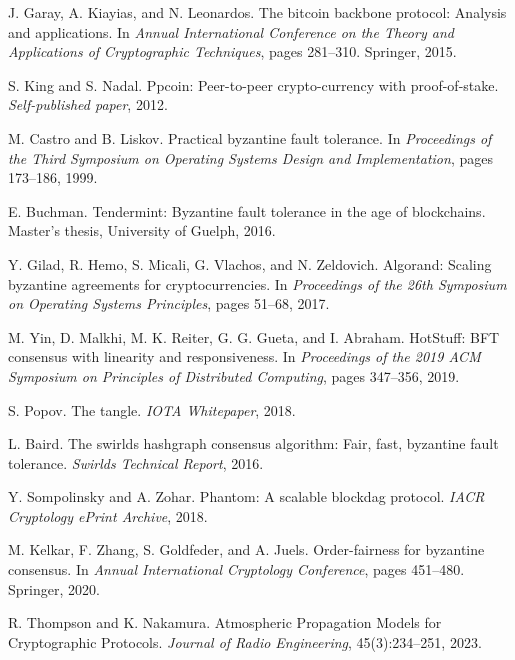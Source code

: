 \documentclass[11pt,a4paper]{article}
\begin{document}
\begin{thebibliography}{99}
J. Garay, A. Kiayias, and N. Leonardos.
\newblock The bitcoin backbone protocol: Analysis and applications.
\newblock In \emph{Annual International Conference on the Theory and Applications of Cryptographic Techniques}, pages 281--310. Springer, 2015.

S. King and S. Nadal.
\newblock Ppcoin: Peer-to-peer crypto-currency with proof-of-stake.
\newblock \emph{Self-published paper}, 2012.

M. Castro and B. Liskov.
\newblock Practical byzantine fault tolerance.
\newblock In \emph{Proceedings of the Third Symposium on Operating Systems Design and Implementation}, pages 173--186, 1999.

E. Buchman.
\newblock Tendermint: Byzantine fault tolerance in the age of blockchains.
\newblock Master's thesis, University of Guelph, 2016.

Y. Gilad, R. Hemo, S. Micali, G. Vlachos, and N. Zeldovich.
\newblock Algorand: Scaling byzantine agreements for cryptocurrencies.
\newblock In \emph{Proceedings of the 26th Symposium on Operating Systems Principles}, pages 51--68, 2017.

M. Yin, D. Malkhi, M. K. Reiter, G. G. Gueta, and I. Abraham.
\newblock HotStuff: BFT consensus with linearity and responsiveness.
\newblock In \emph{Proceedings of the 2019 ACM Symposium on Principles of Distributed Computing}, pages 347--356, 2019.

S. Popov.
\newblock The tangle.
\newblock \emph{IOTA Whitepaper}, 2018.

L. Baird.
\newblock The swirlds hashgraph consensus algorithm: Fair, fast, byzantine fault tolerance.
\newblock \emph{Swirlds Technical Report}, 2016.

Y. Sompolinsky and A. Zohar.
\newblock Phantom: A scalable blockdag protocol.
\newblock \emph{IACR Cryptology ePrint Archive}, 2018.

M. Kelkar, F. Zhang, S. Goldfeder, and A. Juels.
\newblock Order-fairness for byzantine consensus.
\newblock In \emph{Annual International Cryptology Conference}, pages 451--480. Springer, 2020.

R. Thompson and K. Nakamura.
\newblock Atmospheric Propagation Models for Cryptographic Protocols.
\newblock \emph{Journal of Radio Engineering}, 45(3):234--251, 2023.


\end{thebibliography}
\end{document}
